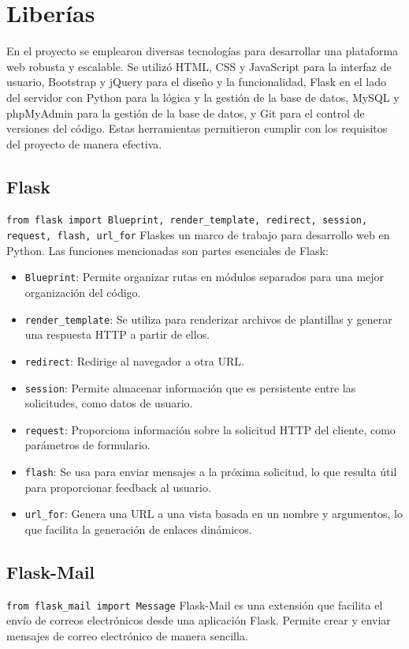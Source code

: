 \documentclass[a4paper, 12pt]{book}
\begin{document}
\section{Liberías}
\label{sec:Librerias}

En el proyecto se emplearon diversas tecnologías para desarrollar una plataforma web robusta y escalable. Se utilizó HTML, CSS y JavaScript para la interfaz de usuario, Bootstrap y jQuery para el diseño y la funcionalidad, Flask en el lado del servidor con Python para la lógica y la gestión de la base de datos, MySQL y phpMyAdmin para la gestión de la base de datos, y Git para el control de versiones del código. Estas herramientas permitieron cumplir con los requisitos del proyecto de manera efectiva.
\subsection{Flask} 
\texttt{from flask import Blueprint, render\_template, redirect, session, request, flash, url\_for} Flask\cite{flaskbook}es un marco de trabajo para desarrollo web en Python. Las funciones mencionadas son partes esenciales de Flask:

\begin{itemize}
  \item \texttt{Blueprint}: Permite organizar rutas en módulos separados para una mejor organización del código.
  \item \texttt{render\_template}: Se utiliza para renderizar archivos de plantillas y generar una respuesta HTTP a partir de ellos.
  \item \texttt{redirect}: Redirige al navegador a otra URL.
  \item \texttt{session}: Permite almacenar información que es persistente entre las solicitudes, como datos de usuario.
  \item \texttt{request}: Proporciona información sobre la solicitud HTTP del cliente, como parámetros de formulario.
  \item \texttt{flash}: Se usa para enviar mensajes a la próxima solicitud, lo que resulta útil para proporcionar feedback al usuario.
  \item \texttt{url\_for}: Genera una URL a una vista basada en un nombre y argumentos, lo que facilita la generación de enlaces dinámicos.
\end{itemize}

\subsection{Flask-Mail}
\texttt{from flask\_mail import Message} Flask-Mail es una extensión que facilita el envío de correos electrónicos desde una aplicación Flask. Permite crear y enviar mensajes de correo electrónico de manera sencilla.
\end{document}
